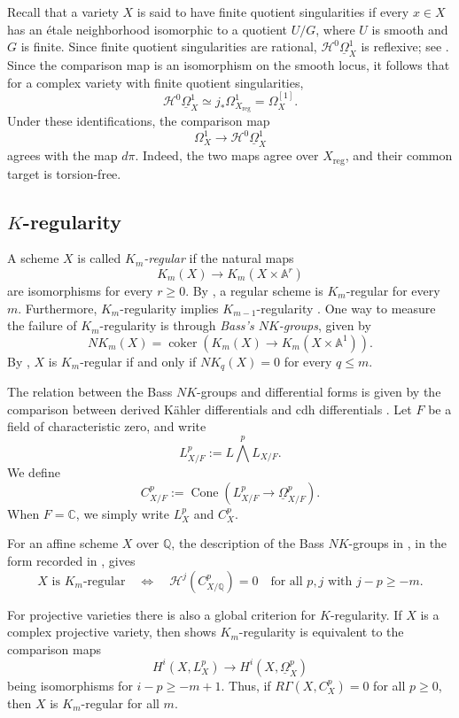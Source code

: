 \documentclass{amsart}
\theoremstyle{definition}
\newcommand{\cH}{\mathcal{H}}
\begin{document}
Recall that a variety $X$ is said to have finite quotient singularities if every $x\in X$ has an \'etale neighborhood isomorphic to a quotient $U/G$, where $U$ is smooth and $G$ is finite. Since finite quotient singularities are rational, $\cH^0\underline{\Omega}^1_X$ is reflexive; see \cite[Remark~2.5]{Shen2025}. Since the comparison map is an isomorphism on the smooth locus, it follows that for a complex variety with finite quotient singularities,
\[
\mathcal H^0\underline{\Omega}^1_X
\simeq
j_*\Omega^1_{X_{\mathrm{reg}}}
=
\Omega_X^{[1]}.
\]
Under these identifications, the comparison map
\[
\Omega_X^1\longrightarrow\cH^0\underline{\Omega}^1_X
\]
agrees with the map $d\pi$. Indeed, the two maps agree over $X_{\mathrm{reg}}$, and their common target is torsion-free.


\subsection{$K$-regularity}
A scheme $X$ is called \textit{$K_m$-regular} if the natural maps
\[
 K_m(X)\longrightarrow K_m(X\times\mathbb A^r)
\]
are isomorphisms for every $r\geq0$. By \cite[\S4 Theorem 3 Corollary 2 and \S7 Proposition 4.1]{Quillen1973}, a regular scheme is $K_m$-regular for every $m$. Furthermore, $K_m$-regularity implies $K_{m-1}$-regularity \cite{Vorst1979, Dayton1980}. One way to measure the failure of $K_m$-regularity is through \textit{Bass's $NK$-groups}, given by
\[
 NK_m(X)=\operatorname{coker}\!\left(
 K_m(X)\longrightarrow K_m(X\times\mathbb A^1)
 \right).
\]
By \cite[Theorem 0.1]{CHWW}, $X$ is $K_m$-regular if and only if $NK_q(X)=0$ for every $q\leq m$.

The relation between the Bass $NK$-groups and differential forms is given by the comparison between derived K\"ahler differentials and cdh differentials \cite{CHSW,Cortinas2007,CHWW}. Let $F$ be a field of characteristic zero, and write
\[
L^p_{X/F}:=L\bigwedge^pL_{X/F}.
\]
We define
\[
C^p_{X/F}:=
\operatorname{Cone}\left(
L^p_{X/F}\longrightarrow
\underline{\Omega}^p_{X/F}
\right).
\]
When $F=\mathbb C$, we simply write $L_X^p$ and $C_X^p$.

For an affine scheme $X$ over $\mathbb Q$, the description of the Bass $NK$-groups in \cite{CHWW}, in the form recorded in \cite[Theorem~2.8 and Remark~2.9]{Shen2025}, gives
\[
X\text{ is }K_m\text{-regular}
\quad\Longleftrightarrow\quad
\mathcal H^j(C^p_{X/\mathbb Q})=0
\quad\text{for all }p,j\text{ with }j-p\geq-m.
\]

For projective varieties there is also a global criterion for $K$-regularity. If $X$ is a complex projective variety, then \cite[Theorem~7.1]{Shen2025} shows $K_m$-regularity is equivalent to the comparison maps
\[
H^i(X,L_X^p)\longrightarrow H^i(X,\underline{\Omega}_X^p)
\]
being isomorphisms for $i-p\geq-m+1$. Thus, if $R\Gamma(X,C_X^p)=0$ for all $p\geq0$, then $X$ is $K_m$-regular for all $m$.
\end{document}
